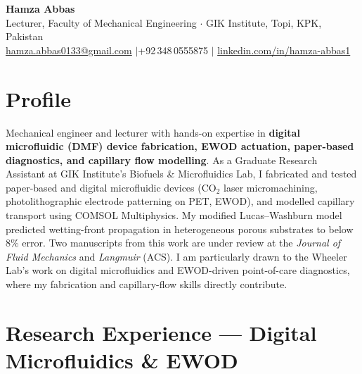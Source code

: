\documentclass[11pt,a4paper]{article}
\begin{document}

\begin{center}
  {\LARGE\bfseries\color{accent} Hamza Abbas}\\[4pt]
  Lecturer, Faculty of Mechanical Engineering $\cdot$ GIK Institute, Topi, KPK,
  Pakistan\\[3pt]
  \href{mailto:hamza.abbas0133@gmail.com}{hamza.abbas0133@gmail.com}
  \quad$|$\quad +92\,348\,0555875
  \quad$|$\quad
  \href{https://linkedin.com/in/hamza-abbas1}{linkedin.com/in/hamza-abbas1}
\end{center}

\section{Profile}

Mechanical engineer and lecturer with hands-on expertise in
\textbf{digital microfluidic (DMF) device fabrication, EWOD actuation, paper-based
diagnostics, and capillary flow modelling}. As a Graduate Research Assistant at GIK
Institute's Biofuels \& Microfluidics Lab, I fabricated and tested paper-based and
digital microfluidic devices (CO$_2$ laser micromachining, photolithographic electrode
patterning on PET, EWOD), and modelled capillary transport using COMSOL Multiphysics.
My modified Lucas--Washburn model predicted wetting-front propagation in heterogeneous
porous substrates to below 8\% error. Two manuscripts from this work are under review
at the \textit{Journal of Fluid Mechanics} and \textit{Langmuir} (ACS). I am
particularly drawn to the Wheeler Lab's work on digital microfluidics and EWOD-driven
point-of-care diagnostics, where my fabrication and capillary-flow skills directly
contribute.

\section{Research Experience — Digital Microfluidics \& EWOD}
\end{document}
